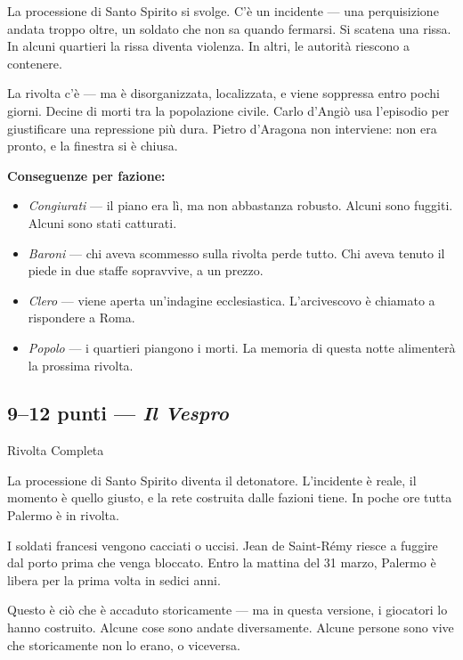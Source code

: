 \filetto

La processione di Santo Spirito si svolge. C'è un incidente — una
perquisizione andata troppo oltre, un soldato che non sa quando
fermarsi. Si scatena una rissa. In alcuni quartieri la rissa diventa
violenza. In altri, le autorità riescono a contenere.

La rivolta c'è — ma è disorganizzata, localizzata, e viene soppressa
entro pochi giorni. Decine di morti tra la popolazione civile.
Carlo d'Angiò usa l'episodio per giustificare una repressione
più dura. Pietro d'Aragona non interviene: non era pronto, e la
finestra si è chiusa.

\textbf{Conseguenze per fazione:}
\begin{itemize}[nosep]
  \item \textit{Congiurati} — il piano era lì, ma non abbastanza
    robusto. Alcuni sono fuggiti. Alcuni sono stati catturati.
  \item \textit{Baroni} — chi aveva scommesso sulla rivolta perde
    tutto. Chi aveva tenuto il piede in due staffe sopravvive,
    a un prezzo.
  \item \textit{Clero} — viene aperta un'indagine ecclesiastica.
    L'arcivescovo è chiamato a rispondere a Roma.
  \item \textit{Popolo} — i quartieri piangono i morti. La memoria
    di questa notte alimenterà la prossima rivolta.
\end{itemize}

\secsep

\subsection{9--12 punti — \textit{Il Vespro}}
\textcolor{oro}{\cinzel\large Rivolta Completa}

\filetto

La processione di Santo Spirito diventa il detonatore. L'incidente
è reale, il momento è quello giusto, e la rete costruita dalle
fazioni tiene. In poche ore tutta Palermo è in rivolta.

I soldati francesi vengono cacciati o uccisi. Jean de Saint-Rémy
riesce a fuggire dal porto prima che venga bloccato. Entro
la mattina del 31 marzo, Palermo è libera per la prima volta
in sedici anni.

Questo è ciò che è accaduto storicamente — ma in questa versione,
i giocatori lo hanno costruito. Alcune cose sono andate diversamente.
Alcune persone sono vive che storicamente non lo erano, o viceversa.

